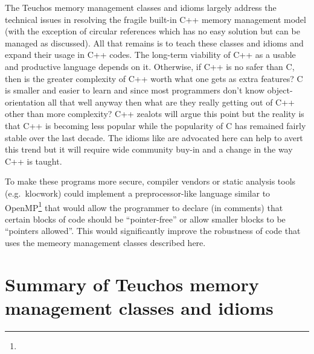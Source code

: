 \documentclass[pdf,ps2pdf,11pt]{SANDreport}
\begin{document}
The Teuchos memory management classes and idioms largely address the
technical issues in resolving the fragile built-in C++ memory
management model (with the exception of circular references which has
no easy solution but can be managed as discussed).  All that remains
is to teach these classes and idioms and expand their usage in C++
codes.  The long-term viability of C++ as a usable and productive
language depends on it.  Otherwise, if C++ is no safer than C, then is
the greater complexity of C++ worth what one gets as extra features?
C is smaller and easier to learn and since most programmers don't know
object-orientation all that well anyway then what are they really
getting out of C++ other than more complexity?  C++ zealots will argue
this point but the reality is that C++ is becoming less popular while
the popularity of C has remained fairly stable over the last decade.
The idioms like are advocated here can help to avert this trend but it
will require wide community buy-in and a change in the way C++ is
taught.

To make these programs more secure, compiler vendors or static
analysis tools (e.g.\ klocwork) could implement a preprocessor-like
language similar to OpenMP\footnote{{}} that
would allow the programmer to declare (in comments) that certain
blocks of code should be ``pointer-free'' or allow smaller blocks to
be ``pointers allowed''.  This would significantly improve the
robustness of code that uses the memeory management classes described
here.



%

\clearpage
\providecommand*{\phantomsection}{}
\phantomsection
{}



%
\appendix


%
{}\section{Summary of Teuchos memory management classes and idioms}
\label{apdx:summary_of_idioms}
%
\end{document}
